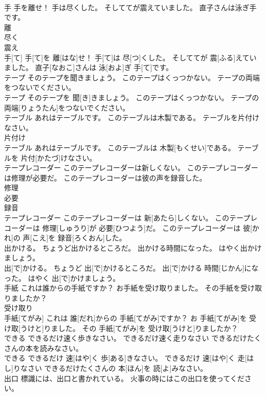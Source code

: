 \documentclass[8pt]{extreport}
\begin{document}
\begin{CJK}{UTF8}{min}
\\	手 手を離せ！ 手は尽くした。 そしててが震えていました。 直子さんは泳ぎ手です。	
\\	離 
\\	尽く 
\\	震え 
\\	手[て] 手[て]を 離[はな]せ！ 手[て]は 尽[つ]くした。 そしててが 震[ふる]えていました。 直子[なおこ]さんは 泳[およ]ぎ 手[て]です。
\\	テープ そのテープを聞きましょう。 このテープはくっつかない。 テープの両端をつないでください。	
\\	テープ そのテープを 聞[き]きましょう。 このテープはくっつかない。 テープの 両端[りょうたん]をつないでください。
\\	テーブル あれはテーブルです。 このテーブルは木製である。 テーブルを片付けなさい。	
\\	片付け 
\\	テーブル あれはテーブルです。 このテーブルは 木製[もくせい]である。 テーブルを 片付[かたづ]けなさい。
\\	テープレコーダー このテープレコーダーは新しくない。 このテープレコーダーは修理が必要だ。 このテープレコーダーは彼の声を録音した。	
\\	修理 
\\	必要 
\\	録音 
\\	テープレコーダー このテープレコーダーは 新[あたら]しくない。 このテープレコーダーは 修理[しゅうり]が 必要[ひつよう]だ。 このテープレコーダーは 彼[かれ]の 声[こえ]を 録音[ろくおん]した。
\\	出かける。 ちょうど出かけるところだ。 出かける時間になった。 はやく出かけましょう。	
\\	出[で]かける。 ちょうど 出[で]かけるところだ。 出[で]かける 時間[じかん]になった。 はやく 出[で]かけましょう。
\\	手紙 これは誰からの手紙ですか？ お手紙を受け取りました。 その手紙を受け取りましたか？	
\\	受け取り 
\\	手紙[てがみ] これは 誰[だれ]からの 手紙[てがみ]ですか？ お 手紙[てがみ]を 受け取[うけと]りました。 その 手紙[てがみ]を 受け取[うけと]りましたか？
\\	できる できるだけ速く歩きなさい。 できるだけ速く走りなさい できるだけたくさんの本を読みなさい。	
\\	できる できるだけ 速[はや]く 歩[ある]きなさい。 できるだけ 速[はや]く 走[はし]りなさい できるだけたくさんの 本[ほん]を 読[よ]みなさい。
\\	出口 標識には、出口と書かれている。 火事の時にはこの出口を使ってください。	

\end{CJK}
\end{document}
